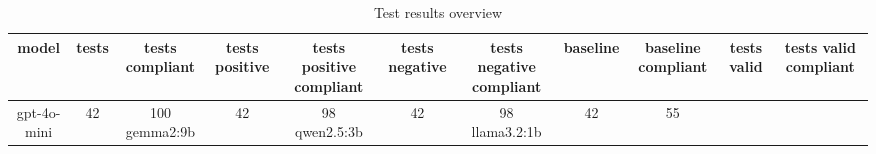 
  \begin{table}[h!]
  \centering
  \begin{tabular}{|c|c|c|c|c|c|c|c|c|c|c|}
  \hline
  model & tests & tests compliant & tests positive & tests positive compliant & tests negative & tests negative compliant & baseline & baseline compliant & tests valid & tests valid compliant \\
  \hline
  gpt-4o-mini & 42 & 100%
\hline
gemma2:9b & 42 & 98%
\hline
qwen2.5:3b & 42 & 98%
\hline
llama3.2:1b & 42 & 55%
  \end{tabular}
  \caption{Test results overview}
  
  \end{table}
  
